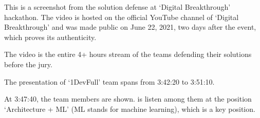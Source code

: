 
This is a screenshot from the solution defense at `Digital Breakthrough' hackathon.
The video is hosted on the official YouTube channel of `Digital Breakthrough'
and was made public on June 22, 2021, two days after the event,
which proves its authenticity.

The video is the entire 4+ hours stream of the teams defending their solutions
before the jury.

The presentation of `1DevFull' team spans from 3:42:20 to 3:51:10.

At 3:47:40, the team members are shown.
\mrl is listen among them at the position `Architecture + ML' (ML stands for machine learning),
which is a key position.



\pagebreak
